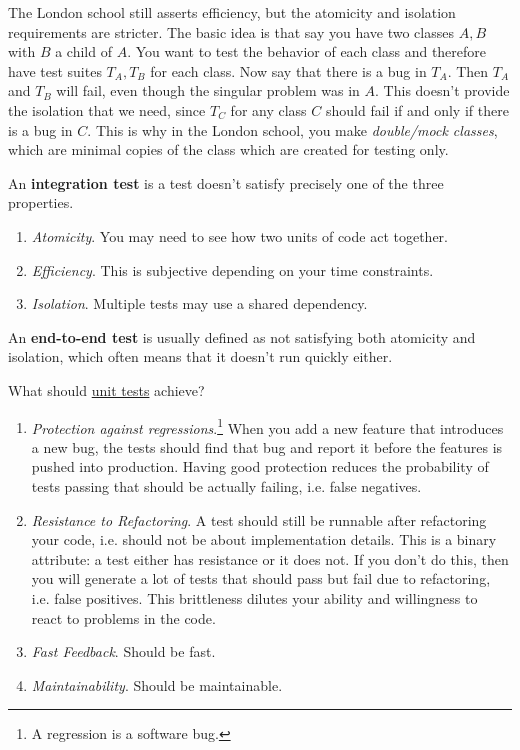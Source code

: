   The London school still asserts efficiency, but the atomicity and isolation requirements are stricter. The basic idea is that say you have two classes $A, B$ with $B$ a child of $A$. You want to test the behavior of each class and therefore have test suites $T_A, T_B$ for each class. Now say that there is a bug in $T_A$. Then $T_A$ and $T_B$ will fail, even though the singular problem was in $A$. This doesn't provide the isolation that we need, since $T_C$ for any class $C$ should fail if and only if there is a bug in $C$. This is why in the London school, you make \textit{double/mock classes}, which are minimal copies of the class which are created for testing only. 

  \begin{definition}
    \label{def:integration-test}
    An \textbf{integration test} is a test doesn't satisfy precisely one of the three properties. 
    \begin{enumerate}
      \item \textit{Atomicity}. You may need to see how two units of code act together. 
      \item \textit{Efficiency}. This is subjective depending on your time constraints. 
      \item \textit{Isolation}. Multiple tests may use a shared dependency. 
    \end{enumerate}
    An \textbf{end-to-end test} is usually defined as not satisfying both atomicity and isolation, which often means that it doesn't run quickly either.  
  \end{definition} 

  What should \hyperref[def:unit-test]{unit tests} achieve? 
  \begin{enumerate}
    \item \textit{Protection against regressions}.\footnote{A regression is a software bug.} When you add a new feature that introduces a new bug, the tests should find that bug and report it before the features is pushed into production. Having good protection reduces the probability of tests passing that should be actually failing, i.e. false negatives. 
    \item \textit{Resistance to Refactoring}. A test should still be runnable after refactoring your code, i.e. should not be about implementation details. This is a binary attribute: a test either has resistance or it does not. If you don't do this, then you will generate a lot of tests that should pass but fail due to refactoring, i.e. false positives. This brittleness dilutes your ability and willingness to react to problems in the code. 
    \item \textit{Fast Feedback}. Should be fast. 
    \item \textit{Maintainability}. Should be maintainable. 
  \end{enumerate}

